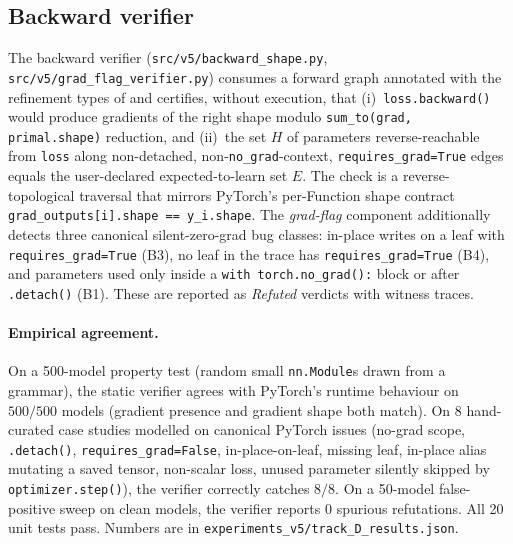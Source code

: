 \subsection{Backward verifier}\label{sec:impl-backward}
The backward verifier
(\texttt{src/v5/backward\_shape.py},
\texttt{src/v5/grad\_flag\_verifier.py})
consumes a forward graph annotated with the refinement types of
 and certifies, without execution, that
(i)~\texttt{loss.backward()} would produce gradients of the right shape
modulo \texttt{sum\_to(grad, primal.shape)} reduction, and (ii)~the set
$H$ of parameters reverse-reachable from \texttt{loss} along
non-detached, non-\texttt{no\_grad}-context, \texttt{requires\_grad=True}
edges equals the user-declared expected-to-learn set $E$. The check is
a reverse-topological traversal that mirrors PyTorch's per-Function
shape contract \verb|grad_outputs[i].shape == y_i.shape|. The
\emph{grad-flag} component additionally detects three canonical
silent-zero-grad bug classes: in-place writes on a leaf with
\texttt{requires\_grad=True} (B3), no leaf in the trace has
\texttt{requires\_grad=True} (B4), and parameters used only inside a
\texttt{with torch.no\_grad():} block or after \texttt{.detach()} (B1).
These are reported as \emph{Refuted} verdicts with witness traces.

\paragraph{Empirical agreement.}
On a 500-model property test (random small \texttt{nn.Module}s drawn
from a grammar), the static verifier agrees with PyTorch's runtime
behaviour on $500/500$ models (gradient presence and gradient shape
both match). On 8 hand-curated case studies modelled on canonical
PyTorch issues (no-grad scope, \texttt{.detach()},
\texttt{requires\_grad=False}, in-place-on-leaf, missing leaf, in-place
alias mutating a saved tensor, non-scalar loss, unused parameter
silently skipped by \texttt{optimizer.step()}), the verifier correctly
catches $8/8$. On a 50-model false-positive sweep on clean models, the
verifier reports $0$ spurious refutations. All 20 unit tests
pass. Numbers are in \texttt{experiments\_v5/track\_D\_results.json}.

